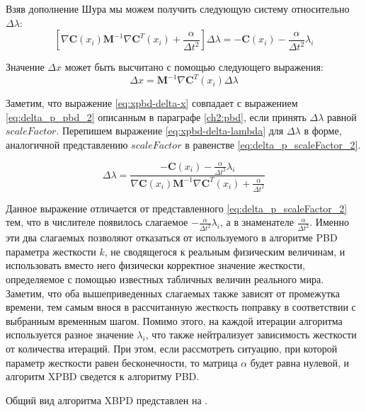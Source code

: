 	Взяв дополнение Шура \cite{prasolov1996} мы можем получить следующую систему относительно $\Delta \lambda$:
\begin{equation} \label{eq:xpbd-delta-lambda}
	\left[\nabla \textbf{C}(x_i) \textbf{M}^{-1} \nabla \textbf{C}^T(x_i) + \frac{\alpha}{\Delta t^2}\right]\Delta \lambda = -\textbf{C}(x_i) - \frac{\alpha}{\Delta t^2}\lambda_i
\end{equation}	

	Значение $\Delta x$ может быть высчитано с помощью следующего выражения:
\begin{equation} \label{eq:xpbd-delta-x}
	 \Delta x = \textbf{M}^{-1} \nabla \textbf{C}^T(x_i) \Delta \lambda
\end{equation}	

	Заметим, что выражение \ref{eq:xpbd-delta-x} совпадает с выражением \ref{eq:delta_p_pbd_2} описанным в параграфе \ref{ch2:pbd}, если принять $\Delta \lambda$ равной $scaleFactor$. Перепишем выражение \ref{eq:xpbd-delta-lambda} для $\Delta \lambda$ в форме, аналогичной представлению $scaleFactor$ в равенстве \ref{eq:delta_p_scaleFactor_2}.
	
\begin{equation} \label{eq:xpbd-delta-lambda-2}
	\Delta \lambda = \frac{-\textbf{C}(x_i) - \frac{\alpha}{\Delta t^2}\lambda_i}{\nabla \textbf{C}(x_i) \textbf{M}^{-1} \nabla \textbf{C}^T(x_i) + \frac{\alpha}{\Delta t^2}}
\end{equation}	

	Данное выражение отличается от представленного  \ref{eq:delta_p_scaleFactor_2} тем, что в числителе появилось слагаемое $- \frac{\alpha}{\Delta t^2}\lambda_i$, а в знаменателе $\frac{\alpha}{\Delta t^2}$. Именно эти два слагаемых позволяют отказаться от используемого в алгоритме PBD параметра жесткости $k$, не сводящегося к реальным физическим величинам, и использовать вместо него физически корректное значение жесткости, определяемое с помощью известных табличных величин реального мира. Заметим, что оба вышеприведенных слагаемых также зависят от промежутка времени, тем самым внося в рассчитанную жесткость поправку в соответствии с выбранным временным шагом. Помимо этого, на каждой итерации алгоритма используется разное значение $\lambda_i$, что также нейтрализует зависимость жесткости от количества итераций. При этом, если рассмотреть ситуацию, при которой параметр жесткости равен бесконечности, то матрица $\alpha$ будет равна нулевой, и алгоритм XPBD сведется к алгоритму PBD. 
	
	Общий вид алгоритма XBPD представлен на .
	
